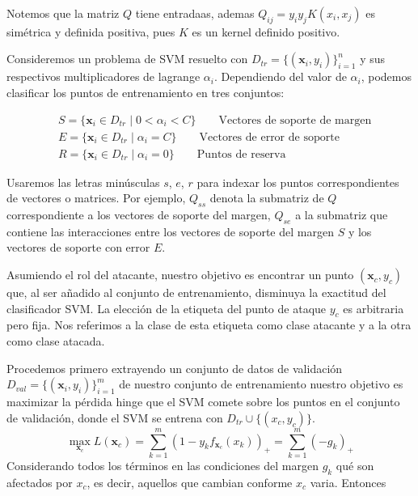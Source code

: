 \documentclass[letterpaper,12pt,oneside]{book}
\begin{document}
{{{{Notemos que la matriz $Q$ tiene entradaas, ademas \(Q_{ij} = y_i y_j K(x_i, x_j)\) es simétrica y definida positiva, pues \(K\) es un kernel definido positivo.

Consideremos un problema de SVM resuelto con  $D_{tr}=\{ (\mathbf{x}_i, y_i) \}_{i=1}^{n}$  y sus respectivos multiplicadores de lagrange \(\alpha_i\). Dependiendo del valor de \(\alpha_i\), podemos clasificar los puntos de entrenamiento en tres conjuntos:
    
\begin{align*}
        & S = \{\mathbf{x}_i \in D_{tr} \mid 0 < \alpha_i < C\} \qquad \text{Vectores de soporte de margen}\\
        & E = \{\mathbf{x}_i \in D_{tr} \mid \alpha_i = C\} \qquad \text{Vectores de error de soporte}\\
        & R = \{\mathbf{x}_i \in D_{tr} \mid \alpha_i = 0 \} \qquad \text{Puntos de reserva}
\end{align*} 
    
Usaremos las letras minúsculas \(s\), \(e\), \(r\) para indexar los puntos correspondientes de vectores o matrices. Por ejemplo, \(Q_{ss}\) denota la submatriz de \(Q\) correspondiente a los vectores de soporte del margen, \(Q_{se}\) a la submatriz que contiene las interacciones entre los vectores de soporte del margen $S$ y los vectores de soporte con error $E$.

Asumiendo el rol del atacante, nuestro objetivo es encontrar un punto \((\mathbf{x}_c, y_c)\) que, al ser añadido al conjunto de entrenamiento, disminuya la exactitud del clasificador SVM. La elección de la etiqueta del punto de ataque \(y_c\) es arbitraria pero fija. Nos referimos a la clase de esta etiqueta como clase atacante y a la otra como clase atacada.

    
    Procedemos primero extrayendo un conjunto de datos de validación $D_{val}= \{ (\mathbf{x}_i,y_i)\}_{i=1}^{m}$ de nuestro conjunto de entrenamiento	 nuestro objetivo es maximizar la pérdida hinge que el SVM comete sobre los puntos en el conjunto de validación, donde el SVM se entrena con $D_{tr} \cup \{(x_c,y_c)\}$.
    \begin{equation}
        \max_{\mathbf{x}_c} L(\mathbf{x}_c)=\sum_{k=1}^{m}(1-y_k f_{\mathbf{x}_c}(x_k))_+ =\sum_{k=1}^{m} (-g_k)_+ \label{eq: 4.0}
    \end{equation}
    Considerando todos los términos en las condiciones del margen $g_k$ qué son afectados por $x_c$, es decir, aquellos que cambian conforme $x_c$ varia. Entonces
    
}}}}
\end{document}

